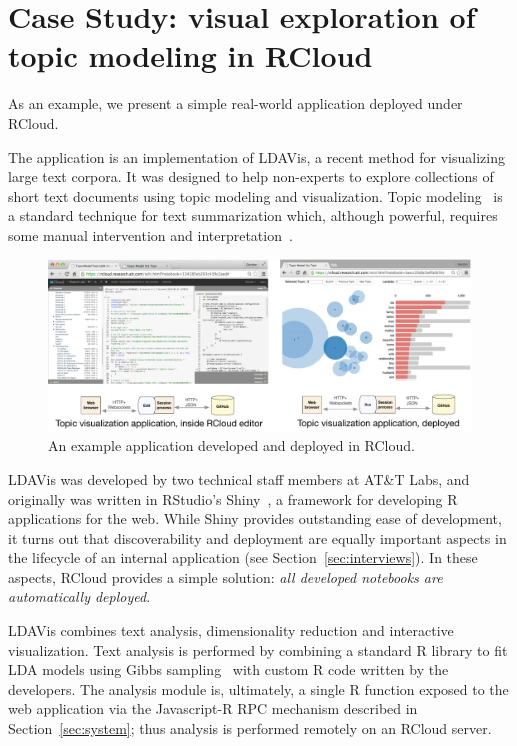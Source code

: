 \section{Case Study\label{sec:casestudy}: visual exploration of topic modeling in RCloud}

As an example, we present a simple real-world application
deployed under RCloud.

The application is an implementation of LDAVis,
a recent method for visualizing large text corpora.
It was designed to help non-experts to explore
collections of short text documents using topic modeling and
visualization. Topic modeling~\cite{Blei:2003:LDA} is a standard
technique for text summarization which, although powerful, requires
some manual intervention and interpretation~\cite{Sievert:2014:LAM}.

\begin{figure}
  \includegraphics[width=\linewidth]{fig/casestudytext/casestudytext.pdf}
  \caption{\label{fig:textvis}An example application developed and deployed in RCloud.}
\end{figure}

LDAVis was developed by two technical staff members at
AT\&T Labs, and originally was written in RStudio's
Shiny~\cite{RStudio:2013:SWA}, a framework for developing R
applications for the web.  While Shiny provides outstanding ease of
development, it turns out that discoverability and deployment are equally
important aspects in the lifecycle of an internal application (see
Section~\ref{sec:interviews}). In these aspects, RCloud provides a
simple solution: \emph{all developed notebooks are automatically deployed}.

LDAVis combines text analysis, dimensionality reduction and
interactive visualization. Text analysis is performed by
combining a standard R library to fit LDA models using
Gibbs sampling~\cite{} with custom R code written by the
developers. The analysis module is, ultimately, a single R function
exposed to the web application via the Javascript-R RPC
mechanism described in Section~\ref{sec:system};
thus analysis is performed remotely on an RCloud server.

